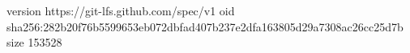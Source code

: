version https://git-lfs.github.com/spec/v1
oid sha256:282b20f76b5599653eb072dbfad407b237e2dfa163805d29a7308ac26cc25d7b
size 153528
